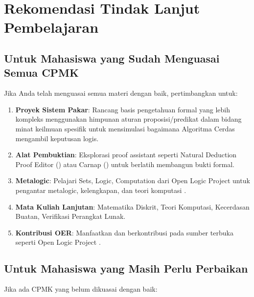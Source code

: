 \section{Rekomendasi Tindak Lanjut Pembelajaran}

\subsection{Untuk Mahasiswa yang Sudah Menguasai Semua CPMK}

Jika Anda telah menguasai semua materi dengan baik, pertimbangkan untuk:

\begin{enumerate}
  \item \textbf{Proyek Sistem Pakar}: Rancang basis pengetahuan formal yang lebih kompleks menggunakan himpunan aturan proposisi/predikat dalam bidang minat keilmuan spesifik untuk mensimulasi bagaimana Algoritma Cerdas mengambil keputusan logis.
  \item \textbf{Alat Pembuktian}: Eksplorasi proof assistant seperti Natural Deduction Proof Editor (\cite{proofs_checker}) atau Carnap (\cite{carnap}) untuk berlatih membangun bukti formal.
  \item \textbf{Metalogic}: Pelajari Sets, Logic, Computation dari Open Logic Project untuk pengantar metalogic, kelengkapan, dan teori komputasi \cite{setslogic}.
  \item \textbf{Mata Kuliah Lanjutan}: Matematika Diskrit, Teori Komputasi, Kecerdasan Buatan, Verifikasi Perangkat Lunak.
  \item \textbf{Kontribusi OER}: Manfaatkan dan berkontribusi pada sumber terbuka seperti Open Logic Project \cite{openlogic}.
\end{enumerate}

\subsection{Untuk Mahasiswa yang Masih Perlu Perbaikan}

Jika ada CPMK yang belum dikuasai dengan baik:

